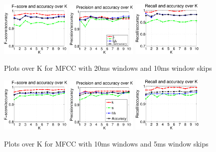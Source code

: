 \begin{figure}


	\centering\includegraphics[width=0.3\textwidth]{tex/appendices/test/mfcc2010FP.png}
	\centering\includegraphics[width=0.3\textwidth]{tex/appendices/test/mfcc2010_P.png}
	\centering\includegraphics[width=0.3\textwidth]{tex/appendices/test/mfcc2010_R.png}
	
	\caption{Plots over K for MFCC with 20ms windows and 10ms window skips}
\end{figure}
\begin{figure}


	\centering\includegraphics[width=0.3\textwidth]{tex/appendices/test/mfcc105FP.png}
	\centering\includegraphics[width=0.3\textwidth]{tex/appendices/test/mfcc105_P.png}
	\centering\includegraphics[width=0.3\textwidth]{tex/appendices/test/mfcc105_R.png}
	
	\caption{Plots over K for MFCC with 10ms windows and 5ms window skips}
\end{figure}
